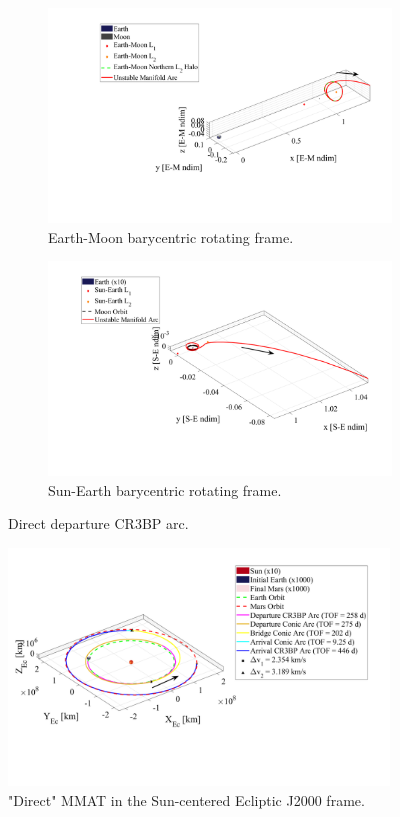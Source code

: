 \begin{figure}[H]
    \begin{subfigure}[h]{0.495\linewidth}
        \includegraphics[width=\textwidth]{figures/DirectEM.pdf}
        \caption{Earth-Moon barycentric rotating frame.}
    \end{subfigure}
    \hfill
    \begin{subfigure}[h]{0.495\linewidth}
        \includegraphics[width=\textwidth]{figures/DirectSE.pdf}
        \caption{Sun-Earth barycentric rotating frame.}
    \end{subfigure}
    \caption{Direct departure CR3BP arc.}
    \label{fig:directE}
\end{figure}

\begin{figure}[H]
    \centering
    \includegraphics[width=0.9\textwidth]{figures/DirectMMAT.pdf}
    \caption{"Direct" MMAT in the Sun-centered Ecliptic J2000 frame.}
    \label{fig:directMMAT}
\end{figure}

